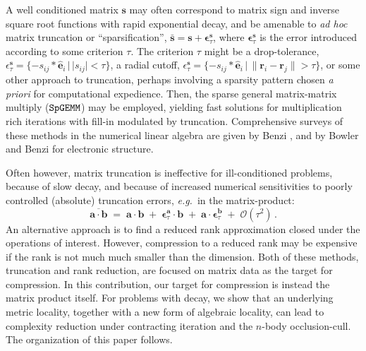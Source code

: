 \documentclass[letterpaper,twocolumn,amsmath,amsfont,amssymb,english,aps,jcp,preprintnumbers,groupaddress,nofootinbib,tightenlines,floatfix]{revtex4}
\newcommand{\mat}[1]{\boldsymbol{#1}}
\theoremstyle{plain}
\theoremstyle{remark}
\theoremstyle{plain}
\begin{document}
A well conditioned matrix $\mat{s}$ may often correspond to matrix
sign and inverse square root functions with rapid exponential decay,
and be amenable to {\em ad hoc} matrix truncation or ``sparsification'', 
$\bar{\mat{s}} = \mat{s}+ \mat{\epsilon}^{\mat{s}}_\tau$,
where $\mat{\epsilon}^{\mat{s}}_\tau$ is the error introduced
according to some criterion $\tau$.  
The criterion $\tau$ might be a drop-tolerance,
$\epsilon^{\mat{s}}_{\tau} = \{-s_{ij}*\hat{\mat{e}}_i \, | \, |s_{ij}|<\tau \}$,
a radial cutoff,
$\epsilon^{\mat{s}}_{\tau} = \{-s_{ij}*\hat{\mat{e}}_i \, | \, \lVert \mat{r}_i - \mat{r}_j \rVert > \tau \}$,
or some other approach to truncation, perhaps involving a sparsity
pattern chosen {\em a priori} for computational expedience.
Then, the sparse general matrix-matrix multiply ($\tt{SpGEMM}$)
\cite{Gustavson78, Toledo97, challacombe00, bowler00} may be employed, yielding fast
solutions for multiplication rich iterations with fill-in modulated by truncation.
Comprehensive surveys of these
methods in the numerical linear algebra are given by Benzi
\cite{Benzi99,Benzi02}, and by Bowler \cite{Bowler12} and Benzi \cite{Benzi13}
for electronic structure.

Often however, matrix truncation is ineffective for ill-conditioned problems, 
because of slow decay, and because of increased numerical sensitivities to poorly 
controlled (absolute) truncation errors, {\em e.g.}~in the matrix-product:
\begin{equation} \label{sparseapprox}
\overline{ \mat{a} \cdot \mat{b} }\; = \; \mat{a}\cdot\mat{b} \; +\; \mat{\epsilon}^{\mat{a}}_\tau \cdot \mat{b} \;+\;
 \mat{a} \cdot \mat{\epsilon}^{\mat{b}}_\tau  \; + \;   {\mathcal O}(\tau^2) \, .
\end{equation}
An alternative approach is to find a reduced rank approximation closed under the operations of interest. 
However, compression to a reduced rank may be expensive if the rank is not much much smaller than the dimension.
Both of these methods, truncation and rank reduction, are focused on matrix data as the target for compression.
In this contribution, our target for compression is instead the matrix product itself.  For problems with
decay, we show that an underlying metric locality, together with a new form of algebraic locality, 
can lead to complexity reduction under contracting iteration and the $n$-body occlusion-cull. The organization of 
this paper follows.
\end{document}
